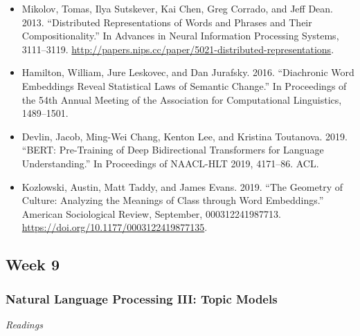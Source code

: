 \documentclass[
  10pt,
]{article}
\providecommand{\tightlist}{%
  \setlength{\itemsep}{0pt}\setlength{\parskip}{0pt}}
\begin{document}
\begin{itemize}
\tightlist
\item
  Mikolov, Tomas, Ilya Sutskever, Kai Chen, Greg Corrado, and Jeff Dean.
  2013. ``Distributed Representations of Words and Phrases and Their
  Compositionality.'' In Advances in Neural Information Processing
  Systems, 3111--3119.
  \url{http://papers.nips.cc/paper/5021-distributed-representations}.
\item
  Hamilton, William, Jure Leskovec, and Dan Jurafsky. 2016. ``Diachronic
  Word Embeddings Reveal Statistical Laws of Semantic Change.'' In
  Proceedings of the 54th Annual Meeting of the Association for
  Computational Linguistics, 1489--1501.
\item
  Devlin, Jacob, Ming-Wei Chang, Kenton Lee, and Kristina Toutanova.
  2019. ``BERT: Pre-Training of Deep Bidirectional Transformers for
  Language Understanding.'' In Proceedings of NAACL-HLT 2019, 4171--86.
  ACL.
\item
  Kozlowski, Austin, Matt Taddy, and James Evans. 2019. ``The Geometry
  of Culture: Analyzing the Meanings of Class through Word Embeddings.''
  American Sociological Review, September, 000312241987713.
  \url{https://doi.org/10.1177/0003122419877135}.
\end{itemize}

\hypertarget{week-9}{%
\subsection{Week 9}\label{week-9}}

\hypertarget{natural-language-processing-iii-topic-models}{%
\subsubsection{Natural Language Processing III: Topic
Models}\label{natural-language-processing-iii-topic-models}}

\emph{Readings}
\end{document}
